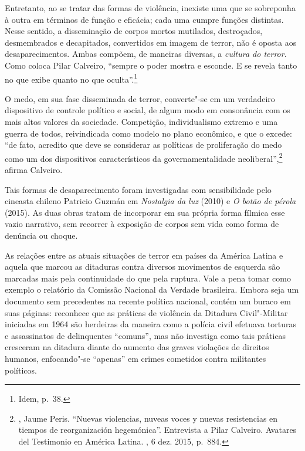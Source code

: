 Entretanto, ao se tratar das formas de violência, inexiste uma que se
sobreponha à outra em términos de função e eficácia; cada uma cumpre
funções distintas. Nesse sentido, a disseminação de corpos mortos
mutilados, destroçados, desmembrados e decapitados, convertidos em
imagem de terror, não é oposta aos desaparecimentos. Ambas compõem, de
maneiras diversas, a \emph{cultura do terror}. Como coloca Pilar
Calveiro, ``sempre o poder mostra e esconde. E se revela tanto no que
exibe quanto no que oculta''.\footnote{Idem, p.~38.}

O medo, em sua fase disseminada de terror, converte"-se em um verdadeiro
dispositivo de controle político e social, de algum modo em consonância
com os mais altos valores da sociedade. Competição,
individualismo extremo e uma guerra de todos, reivindicada como modelo no plano econômico, e que o excede: ``de fato, acredito que deve se
considerar as políticas de proliferação do medo como um dos dispositivos
característicos da governamentalidade neoliberal'',\footnote{, Jaume
  Peris. ``Nuevas violencias, nuveas voces y nuevas resistencias en
  tiempos de reorganización hegemónica''. Entrevista a Pilar Calveiro.
  Avatares del Testimonio en América Latina. {}, 6 dez.
  2015, p.~884.} afirma Calveiro.

Tais formas de desaparecimento foram investigadas com sensibilidade pelo
cineasta chileno Patricio Guzmán em \emph{Nostalgia da luz} (2010) e
\emph{O botão de pérola} (2015). As duas obras tratam de incorporar em
sua própria forma fílmica esse vazio narrativo, sem recorrer à exposição
de corpos sem vida como forma de denúncia ou choque.

\asterisc

As relações entre as atuais situações de terror em países da América
Latina e aquela que marcou as ditaduras contra diversos movimentos de
esquerda são marcadas mais pela continuidade do que pela ruptura. Vale a
pena tomar como exemplo o relatório da Comissão Nacional da Verdade
brasileira. Embora seja um documento sem precedentes na recente política
nacional, contém um buraco em suas páginas: reconhece que as práticas de
violência da Ditadura Civil"-Militar iniciadas em 1964 são herdeiras da
maneira como a polícia civil efetuava torturas e assassinatos de
delinquentes ``comuns'', mas não investiga como tais práticas cresceram
na ditadura diante do aumento das graves violações de direitos humanos,
enfocando"-se ``apenas'' em crimes cometidos contra militantes políticos.

